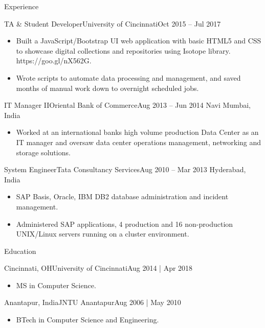 \documentclass[]{mcdowellcv}
\begin{document}
\begin{cvsection}{Experience}
\begin{cvsubsection}{TA \& Student Developer}{University of Cincinnati}{Oct 2015 -- Jul 2017}
\begin{itemize}
			\item Built a JavaScript/Bootstrap UI web application with basic HTML5 and CSS to showcase digital collections and repositories using Isotope library. https://goo.gl/nX562G.
			\item Wrote scripts to automate data processing and management, and saved months of manual work down to overnight scheduled jobs.
		\end{itemize}
	\end{cvsubsection}
	\begin{cvsubsection}{IT Manager II}{Oriental Bank of Commerce}{Aug 2013 -- Jun 2014}
		Navi Mumbai, India
		\begin{itemize}%
			\item Worked at an international bank\textquotesingle{}s high volume production Data Center as an IT manager and oversaw data center operations management, networking and storage solutions.
		\end{itemize}
	\end{cvsubsection}
	\begin{cvsubsection}{System Engineer}{Tata Consultancy Services}{Aug 2010 -- Mar 2013}
		Hyderabad, India
		\begin{itemize}%
			\item SAP Basis, Oracle, IBM DB2 database administration and incident management.
			\item Administered SAP applications, 4 production and 16 non-production UNIX/Linux servers running on a cluster environment.
		\end{itemize}
	\end{cvsubsection}
\end{cvsection}
\begin{cvsection}{Education}
	\begin{cvsubsection}{Cincinnati, OH}{University of Cincinnati}{Aug 2014 | Apr 2018}
		\begin{itemize}
			\item MS in Computer Science.
		\end{itemize}
	\end{cvsubsection}
	\begin{cvsubsection}{Anantapur, India}{JNTU Anantapur}{Aug 2006 | May 2010}
		\begin{itemize}
			\item BTech in Computer Science and Engineering.
		\end{itemize}
	\end{cvsubsection}
\end{cvsection}
\end{document}
